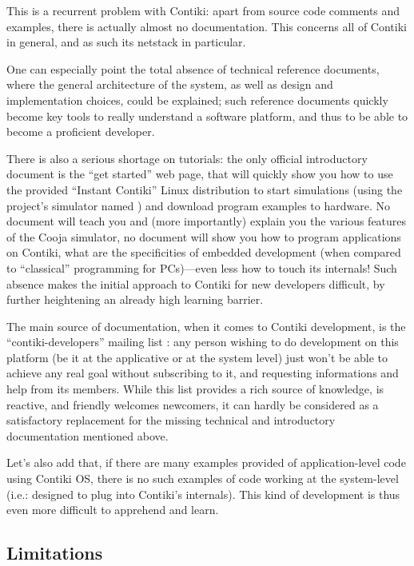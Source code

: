 \documentclass[12pt,twoside,a4paper]{article}
\begin{document}
This is a recurrent problem with Contiki: apart from source code comments
and examples, there is actually almost no documentation. This concerns
all of Contiki in general, and as such its netstack in particular.

One can especially point the total absence of technical reference documents,
where the general architecture of the system, as well as design and
implementation choices, could be explained; such reference documents
quickly become key tools to really understand a software platform,
and thus to be able to become a proficient developer.

There is also a serious shortage on tutorials: the only official introductory
document is the ``get started'' web page, that will quickly show you how to
use the provided ``Instant Contiki'' Linux distribution to start simulations
(using the project's simulator named  \cite{cooja}) and download
program examples to hardware. No document will teach you and (more
importantly) explain you the various features of the Cooja simulator,
no document will show you how to program applications on Contiki, what are
the specificities of embedded development (when compared to ``classical''
programming for PCs)---even less how to touch its internals!
Such absence makes the initial approach to Contiki for new developers
difficult, by further heightening an already high learning barrier.

The main source of documentation, when it comes to Contiki development,
is the ``contiki-developers'' mailing list \cite{contiki-dev-ml}: any person
wishing to do development on this platform (be it at the applicative or at
the system level) just won't be able to achieve any real goal without
subscribing to it, and requesting informations and help from its members.
While this list provides a rich source of knowledge, is reactive, and
friendly welcomes newcomers, it can hardly be considered as a satisfactory
replacement for the missing technical and introductory documentation
mentioned above.

Let's also add that, if there are many examples provided of application-level
code using Contiki OS, there is no such examples of code working at the
system-level (i.e.: designed to plug into Contiki's internals). This kind
of development is thus even more difficult to apprehend and learn.


\subsection{Limitations}
\end{document}
